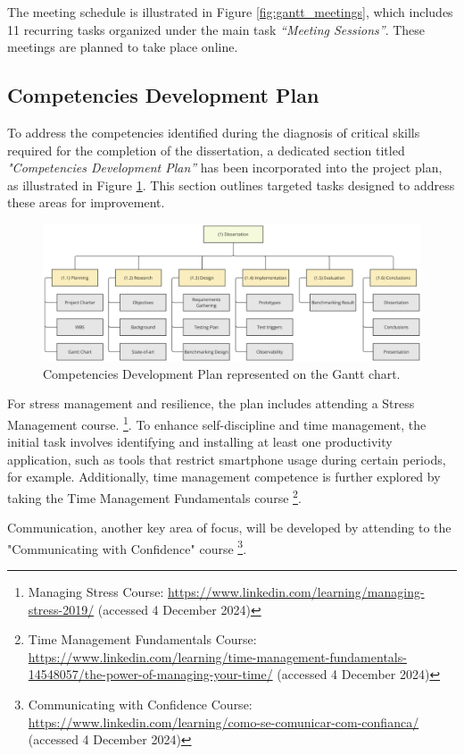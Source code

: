 The meeting schedule is illustrated in Figure \ref{fig:gantt_meetings}, which includes 11 recurring tasks organized under the main task \textit{“Meeting Sessions”}. These meetings are planned to take place online.

\subsection{Competencies Development Plan}

To address the competencies identified during the diagnosis of critical skills required for the completion of the dissertation, a dedicated section titled \textit{"Competencies Development Plan”} has been incorporated into the project plan, as illustrated in Figure \ref{fig:gantt_competency}. This section outlines targeted tasks designed to address these areas for improvement.

\begin{figure}
      \centering
      \includegraphics[width=\linewidth]{ch-planning/assets/wbs.png}
      \caption{Competencies Development Plan represented on the Gantt chart.}
      \label{fig:gantt_competency}
\end{figure}

For stress management and resilience, the plan includes attending a Stress Management course.
\footnote{Managing Stress Course: \url{https://www.linkedin.com/learning/managing-stress-2019/} (accessed 4 December 2024)}. To enhance self-discipline and time management, the initial task involves identifying and installing at least one productivity application, such as tools that restrict smartphone usage during certain periods, for example. Additionally, time management competence is further explored by taking the Time Management Fundamentals course
\footnote{Time Management Fundamentals Course: \url{https://www.linkedin.com/learning/time-management-fundamentals-14548057/the-power-of-managing-your-time/} (accessed 4 December 2024)}.

Communication, another key area of focus, will be developed by attending to the "Communicating with Confidence" course
\footnote{Communicating with Confidence Course: \url{https://www.linkedin.com/learning/como-se-comunicar-com-confianca/} (accessed 4 December 2024)}.

